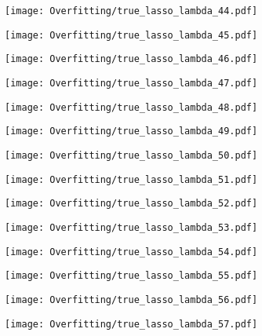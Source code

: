 \documentclass[xcolor=pdftex,dvipsnames,table]{beamer}
\begin{document}
\frame
{
	\begin{center}
		\texttt{[image: Overfitting/true\_lasso\_lambda\_44.pdf]}
	\end{center}
}
\frame
{
	\begin{center}
		\texttt{[image: Overfitting/true\_lasso\_lambda\_45.pdf]}
	\end{center}
}
\frame
{
	\begin{center}
		\texttt{[image: Overfitting/true\_lasso\_lambda\_46.pdf]}
	\end{center}
}
\frame
{
	\begin{center}
		\texttt{[image: Overfitting/true\_lasso\_lambda\_47.pdf]}
	\end{center}
}
\frame
{
	\begin{center}
		\texttt{[image: Overfitting/true\_lasso\_lambda\_48.pdf]}
	\end{center}
}
\frame
{
	\begin{center}
		\texttt{[image: Overfitting/true\_lasso\_lambda\_49.pdf]}
	\end{center}
}
\frame
{
	\begin{center}
		\texttt{[image: Overfitting/true\_lasso\_lambda\_50.pdf]}
	\end{center}
}
\frame
{
	\begin{center}
		\texttt{[image: Overfitting/true\_lasso\_lambda\_51.pdf]}
	\end{center}
}
\frame
{
	\begin{center}
		\texttt{[image: Overfitting/true\_lasso\_lambda\_52.pdf]}
	\end{center}
}
\frame
{
	\begin{center}
		\texttt{[image: Overfitting/true\_lasso\_lambda\_53.pdf]}
	\end{center}
}
\frame
{
	\begin{center}
		\texttt{[image: Overfitting/true\_lasso\_lambda\_54.pdf]}
	\end{center}
}
\frame
{
	\begin{center}
		\texttt{[image: Overfitting/true\_lasso\_lambda\_55.pdf]}
	\end{center}
}
\frame
{
	\begin{center}
		\texttt{[image: Overfitting/true\_lasso\_lambda\_56.pdf]}
	\end{center}
}
\frame
{
	\begin{center}
		\texttt{[image: Overfitting/true\_lasso\_lambda\_57.pdf]}
	\end{center}
}
\end{document}
